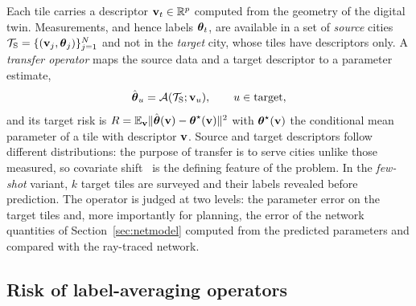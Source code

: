 Each tile carries a descriptor $\mathbf{v}_t\in\mathbb{R}^{p}$ computed from the geometry
of the digital twin. Measurements, and hence labels $\boldsymbol{\theta}_t$, are
available in a set of \emph{source} cities
$\mathcal{T}_{\mathrm{S}}=\{(\mathbf{v}_j,\boldsymbol{\theta}_j)\}_{j=1}^{N}$ and not in the
\emph{target} city, whose tiles have descriptors only. A \emph{transfer
operator} maps the source data and a target descriptor to a parameter
estimate,
\begin{equation}
\hat{\boldsymbol{\theta}}_u=\mathcal{A}(\mathcal{T}_{\mathrm{S}};\mathbf{v}_u),\qquad u\in\text{target},
\label{eq:operator}
\end{equation}
and its target risk is $R=\mathbb{E}_{\mathbf{v}}\lVert\hat{\boldsymbol{\theta}}(\mathbf{v})-\boldsymbol{\theta}^{\star}(\mathbf{v})\rVert^{2}$
with $\boldsymbol{\theta}^{\star}(\mathbf{v})$ the conditional mean parameter of a tile with
descriptor $\mathbf{v}$. Source and target descriptors follow different
distributions: the purpose of transfer is to serve cities unlike those
measured, so covariate shift~\cite{shimodaira2000,bendavid2010} is the
defining feature of the problem. In the \emph{few-shot} variant, $k$ target
tiles are surveyed and their labels revealed before prediction. The operator
is judged at two levels: the parameter error on the target tiles and, more
importantly for planning, the error of the network quantities of
Section~\ref{sec:netmodel} computed from the predicted parameters and
compared with the ray-traced network.

\subsection{Risk of label-averaging operators}
\label{sec:decomp}

